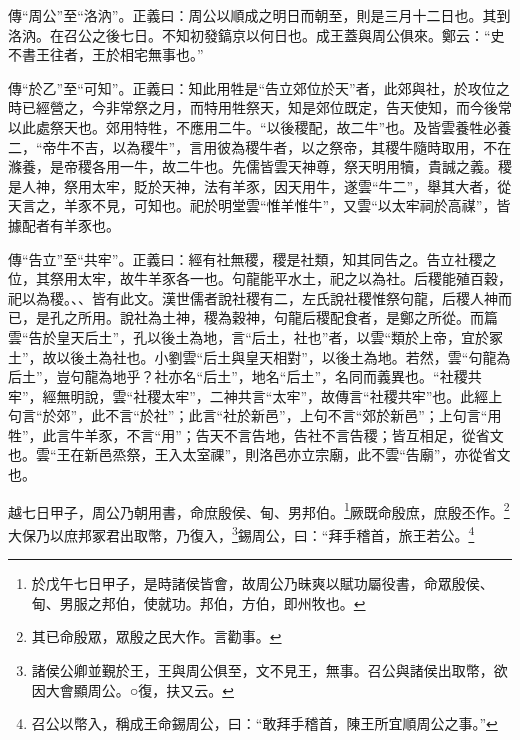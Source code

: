 {\noindent\zhuan{}\fzbyks 傳“周公”至“洛汭”。正義曰：周公以順成之明日而朝至，則是三月十二日也。其到洛汭。在召公之後七日。不知初發鎬京以何日也。成王蓋與周公俱來。鄭云：“史不書王往者，王於相宅無事也。” \par}

{\noindent\zhuan{}\fzbyks 傳“於乙”至“可知”。正義曰：知此用牲是“告立郊位於天”者，此郊與社，於攻位之時已經營之，今非常祭之月，而特用牲祭天，知是郊位既定，告天使知，而今後常以此處祭天也。郊用特牲，不應用二牛。“以後稷配，故二牛”也。及皆雲養牲必養二，“帝牛不吉，以為稷牛”，言用彼為稷牛者，以之祭帝，其稷牛隨時取用，不在滌養，是帝稷各用一牛，故二牛也。先儒皆雲天神尊，祭天明用犢，貴誠之義。稷是人神，祭用太牢，貶於天神，法有羊豕，因天用牛，遂雲“牛二”，舉其大者，從天言之，羊豕不見，可知也。祀於明堂雲“惟羊惟牛”，又雲“以太牢祠於高禖”，皆據配者有羊豕也。 \par}

{\noindent\zhuan{}\fzbyks 傳“告立”至“共牢”。正義曰：經有社無稷，稷是社類，知其同告之。告立社稷之位，其祭用太牢，故牛羊豕各一也。句龍能平水土，祀之以為社。后稷能殖百穀，祀以為稷。、、皆有此文。漢世儒者說社稷有二，左氏說社稷惟祭句龍，后稷人神而已，是孔之所用。說社為土神，稷為穀神，句龍后稷配食者，是鄭之所從。而篇雲“告於皇天后土”，孔以後土為地，言“后土，社也”者，以雲“類於上帝，宜於冢土”，故以後土為社也。小劉雲“后土與皇天相對”，以後土為地。若然，雲“句龍為后土”，豈句龍為地乎？社亦名“后土”，地名“后土”，名同而義異也。“社稷共牢”，經無明說，雲“社稷太牢”，二神共言“太牢”，故傳言“社稷共牢”也。此經上句言“於郊”，此不言“於社”；此言“社於新邑”，上句不言“郊於新邑”；上句言“用牲”，此言牛羊豕，不言“用”；告天不言告地，告社不言告稷；皆互相足，從省文也。雲“王在新邑烝祭，王入太室祼”，則洛邑亦立宗廟，此不雲“告廟”，亦從省文也。 \par}

越七日甲子，周公乃朝用書，命庶殷侯、甸、男邦伯。\footnote{於戊午七日甲子，是時諸侯皆會，故周公乃昧爽以賦功屬役書，命眾殷侯、甸、男服之邦伯，使就功。邦伯，方伯，即州牧也。}厥既命殷庶，庶殷丕作。\footnote{其已命殷眾，眾殷之民大作。言勸事。}大保乃以庶邦冢君出取幣，乃復入，\footnote{諸侯公卿並覲於王，王與周公俱至，文不見王，無事。召公與諸侯出取幣，欲因大會顯周公。○復，扶又云。}錫周公，曰：“拜手稽首，旅王若公。\footnote{召公以幣入，稱成王命錫周公，曰：“敢拜手稽首，陳王所宜順周公之事。”}

